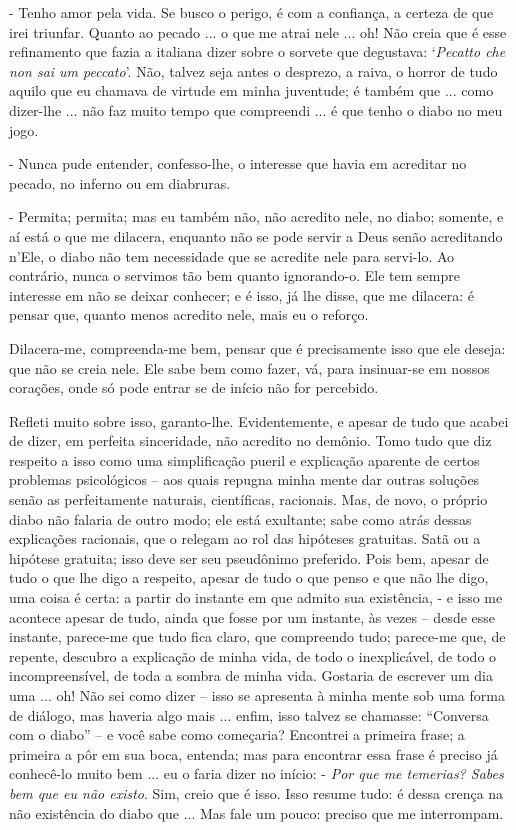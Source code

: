 - Tenho amor pela vida. Se busco o perigo, é com a confiança, a certeza
de que irei triunfar. Quanto ao pecado ... o que me atrai nele ... oh!
Não creia que é esse refinamento que fazia a italiana dizer sobre o
sorvete que degustava: `\emph{Pecatto che non sai um peccato}'. Não,
talvez seja antes o desprezo, a raiva, o horror de tudo aquilo que eu
chamava de virtude em minha juventude; é também que ... como dizer-lhe
... não faz muito tempo que compreendi ... é que tenho o diabo no meu
jogo.

- Nunca pude entender, confesso-lhe, o interesse que havia em acreditar
no pecado, no inferno ou em diabruras.

- Permita; permita; mas eu também não, não acredito nele, no diabo;
somente, e aí está o que me dilacera, enquanto não se pode servir a Deus
senão acreditando n'Ele, o diabo não tem necessidade que se acredite
nele para servi-lo. Ao contrário, nunca o servimos tão bem quanto
ignorando-o. Ele tem sempre interesse em não se deixar conhecer; e é
isso, já lhe disse, que me dilacera: é pensar que, quanto menos acredito
nele, mais eu o reforço.

Dilacera-me, compreenda-me bem, pensar que é precisamente isso que ele
deseja: que não se creia nele. Ele sabe bem como fazer, vá, para
insinuar-se em nossos corações, onde só pode entrar se de início não for
percebido.

Refleti muito sobre isso, garanto-lhe. Evidentemente, e apesar de tudo
que acabei de dizer, em perfeita sinceridade, não acredito no demônio.
Tomo tudo que diz respeito a isso como uma simplificação pueril e
explicação aparente de certos problemas psicológicos -- aos quais
repugna minha mente dar outras soluções senão as perfeitamente naturais,
científicas, racionais. Mas, de novo, o próprio diabo não falaria de
outro modo; ele está exultante; sabe como atrás dessas explicações
racionais, que o relegam ao rol das hipóteses gratuitas. Satã ou a
hipótese gratuita; isso deve ser seu pseudônimo preferido. Pois bem,
apesar de tudo o que lhe digo a respeito, apesar de tudo o que penso e
que não lhe digo, uma coisa é certa: a partir do instante em que admito
sua existência, - e isso me acontece apesar de tudo, ainda que fosse por
um instante, às vezes -- desde esse instante, parece-me que tudo fica
claro, que compreendo tudo; parece-me que, de repente, descubro a
explicação de minha vida, de todo o inexplicável, de todo o
incompreensível, de toda a sombra de minha vida. Gostaria de escrever um
dia uma ... oh! Não sei como dizer -- isso se apresenta à minha mente
sob uma forma de diálogo, mas haveria algo mais ... enfim, isso talvez
se chamasse: ``Conversa com o diabo'' -- e você sabe como começaria?
Encontrei a primeira frase; a primeira a pôr em sua boca, entenda; mas
para encontrar essa frase é preciso já conhecê-lo muito bem ... eu o
faria dizer no início: - \emph{Por que me temerias? Sabes bem que eu não
existo}. Sim, creio que é isso. Isso resume tudo: é dessa crença na não
existência do diabo que ... Mas fale um pouco: preciso que me
interrompam.

